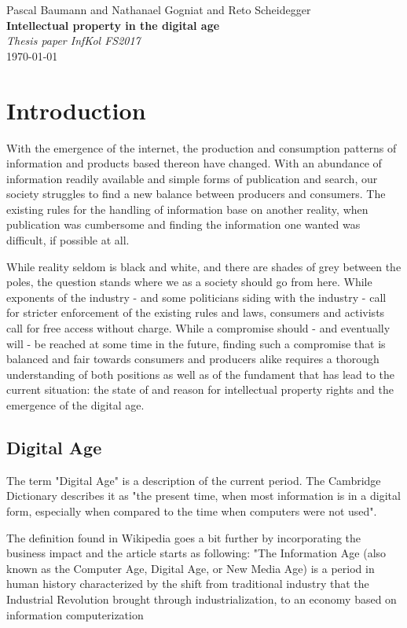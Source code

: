 \documentclass[a4paper]{report}
\newcommand*{\titleAP}{\begingroup %
	\centering
	\vspace*{\baselineskip} %
	
	{\Large Pascal Baumann} and {\Large Nathanael Gogniat} and {\Large Reto Scheidegger}\\[0.167\textheight] %
	
	{\Huge\bfseries Intellectual property in the digital age}\\[\baselineskip]
	
	{\Large \textit{Thesis paper InfKol FS2017}}\\
	\today
	
	\vspace*{3\baselineskip} %
	\endgroup}
\begin{document}
\titleAP

\begin{abstract}
	\blindtext
	
\end{abstract}
\newpage

\tableofcontents

\newpage

\chapter{Introduction}
\label{ch:Intro}
With the emergence of the internet, the production and consumption patterns of information and products based thereon have changed. With an abundance of information readily available and simple forms of publication and search, our society struggles to find a new balance between producers and consumers. The existing rules for the handling of information base on another reality, when publication was cumbersome and finding the information one wanted was difficult, if possible at all. 

While reality seldom is black and white, and there are shades of grey between the poles, the question stands where we as a society should go from here. While exponents of the industry - and some politicians siding with the industry - call for stricter enforcement of the existing rules and laws, consumers and activists call for free access without charge. While a compromise should - and eventually will - be reached at some time in the future, finding such a compromise that is balanced and fair towards consumers and producers alike requires a thorough understanding of both positions as well as of the fundament that has lead to the current situation: the state of and reason for intellectual property rights and the emergence of the digital age.

\section{Digital Age}
\label{sec:Digital age}
The term "Digital Age" is a description of the current period. The Cambridge Dictionary describes it as "the present time, when most information is in a digital form, especially when compared to the time when computers were not used". \parencite{CambridgeUniversityPress2014}

The definition found in Wikipedia goes a bit further by incorporating the business impact and the article starts as following: "The Information Age (also known as the Computer Age, Digital Age, or New Media Age) is a period in human history characterized by the shift from traditional industry that the Industrial Revolution brought through industrialization, to an economy based on information computerization \parencite{WikiInfoAge2017}
\end{document}
